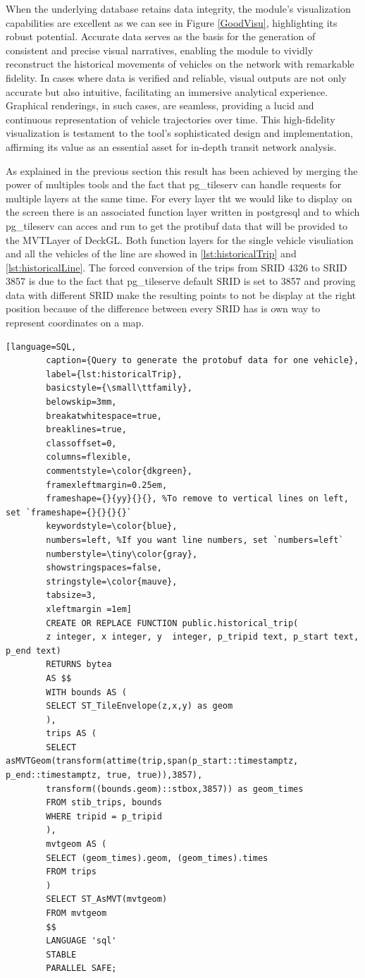 \documentclass[12pt]{report}
\begin{document}
	When the underlying database retains data integrity, the module's visualization capabilities are excellent as  we can see in Figure \ref{GoodVisu}, highlighting its robust potential. Accurate data serves as the basis for the generation of consistent and precise visual narratives, enabling the module to vividly reconstruct the historical movements of vehicles on the network with remarkable fidelity. In cases where data is verified and reliable, visual outputs are not only accurate but also intuitive, facilitating an immersive analytical experience. Graphical renderings, in such cases, are seamless, providing a lucid and continuous representation of vehicle trajectories over time. This high-fidelity visualization is testament to the tool's sophisticated design and implementation, affirming its value as an essential asset for in-depth transit network analysis.
	
	As explained in the  previous section this result has been achieved by merging the power of multiples tools and the fact that pg\_tileserv can  handle requests for  multiple layers at the same time. For every layer tht we would  like to display on the screen there is an associated function layer written in postgresql and to which pg\_tileserv can acces and run to get the protibuf data that will be provided to the MVTLayer of DeckGL. Both function layers for the single vehicle visuliation and all the vehicles of the line are showed in \ref{lst:historicalTrip} and \ref{lst:historicalLine}. The forced conversion of the trips from SRID 4326 to SRID 3857 is due to the fact that pg\_tileserve default SRID is set to 3857 and proving data with different SRID make the resulting points to not be display at the right position because of the difference between every SRID has is own way to represent coordinates on a map. 
	
	
	\begin{lstlisting}[language=SQL,
		caption={Query to generate the protobuf data for one vehicle},
		label={lst:historicalTrip},
		basicstyle={\small\ttfamily},
		belowskip=3mm,
		breakatwhitespace=true,
		breaklines=true,
		classoffset=0,
		columns=flexible,
		commentstyle=\color{dkgreen},
		framexleftmargin=0.25em,
		frameshape={}{yy}{}{}, %To remove to vertical lines on left, set `frameshape={}{}{}{}`
		keywordstyle=\color{blue},
		numbers=left, %If you want line numbers, set `numbers=left`
		numberstyle=\tiny\color{gray},
		showstringspaces=false,
		stringstyle=\color{mauve},
		tabsize=3,
		xleftmargin =1em]
		CREATE OR REPLACE FUNCTION public.historical_trip(
		z integer, x integer, y  integer, p_tripid text, p_start text, p_end text)
		RETURNS bytea
		AS $$
		WITH bounds AS (
		SELECT ST_TileEnvelope(z,x,y) as geom
		),
		trips AS (
		SELECT asMVTGeom(transform(attime(trip,span(p_start::timestamptz, p_end::timestamptz, true, true)),3857),
		transform((bounds.geom)::stbox,3857)) as geom_times
		FROM stib_trips, bounds
		WHERE tripid = p_tripid
		),
		mvtgeom AS (
		SELECT (geom_times).geom, (geom_times).times
		FROM trips
		)
		SELECT ST_AsMVT(mvtgeom) 
		FROM mvtgeom
		$$
		LANGUAGE 'sql'
		STABLE
		PARALLEL SAFE;
	\end{lstlisting}
	
\end{document}
